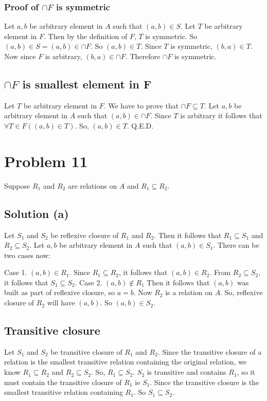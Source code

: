 \documentclass{article}
\begin{document}
\subsubsection{Proof of $\cap F$ is symmetric}
Let $a,b$ be arbitrary element in $A$ such that $(a,b) \in S$. Let $T$
be arbitrary element in $F$. Then by the definition of $F$, $T$ is
symmetric. So $(a,b) \in S = (a,b) \in \cap F$. So $(a,b) \in T$.
Since $T$ is symmetric, $(b,a) \in T$. Now since $F$ is arbitrary,
$(b,a) \in \cap F$. Therefore $\cap F$ is symmetric.

\subsection{$\cap F$ is smallest element in F}
Let $T$ be arbitrary element in $F$. We have to prove that $\cap F
\subseteq T$. Let $a,b$ be arbitrary element in $A$ such that $(a,b)
\in \cap F$. Since $T$ is arbitrary it follows that $\forall T \in
F((a,b) \in T)$. So, $(a,b) \in T$. Q.E.D.

\section{Problem 11}
Suppose $R_1$ and $R_2$ are relations on $A$ and $R_1 \subseteq R_2$.
\subsection{Solution (a)}
Let $S_1$ and $S_2$ be reflexive closure of $R_1$ and $R_2$. Then it
follows that $R_1 \subseteq S_1$ and $R_2 \subseteq S_2$. Let $a,b$ be
arbitrary element in $A$ such that $(a,b) \in S_1$. There can be two
cases now:

Case 1. $(a,b) \in R_1$. Since $R_1 \subseteq R_2$, it follows that
$(a,b) \in R_2$. From $R_2 \subseteq S_2$, it follows that $S_1
\subseteq S_2$.
Case 2. $(a,b) \notin R_1$ Then it follows that $(a,b)$ was built as
part of reflexive closure, so $a = b$. Now $R_2$ is a relation on $A$.
So, reflexive closure of $R_2$ will have $(a,b)$. So $(a,b) \in S_2$.

\subsection{Transitive closure}
Let $S_1$ and $S_2$ be transitive closure of $R_1$ and $R_2$. Since
the transitive closure of a relation is the smallest transitive
relation containing the original relation, we know $R_1 \subseteq R_2$
and $R_2 \subseteq S_2$. So, $R_1 \subseteq S_2$. $S_2$ is transitive
and contains $R_1$, so it must contain the transitive closure of $R_1$
ie $S_1$. Since the transitive closure is the smallest transitive
relation containing $R_1$. So $S_1 \subseteq S_2$.
\end{document}
